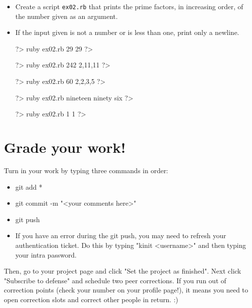 \documentclass{42-en}
\begin{document}
\makeheaderfiles

\begin{itemize}

\item Create a script \texttt{ex02.rb} that prints the prime factors, in increasing order, of the number given as an argument.
\item If the input given is not a number or is less than one, print only a newline.

\begin{42console}
	?> ruby ex02.rb 29
	29
	?>
\end{42console}

\begin{42console}
	?> ruby ex02.rb 242
	2,11,11
	?>
\end{42console}

\begin{42console}
	?> ruby ex02.rb 60
	2,2,3,5
	?>
\end{42console}

\begin{42console}
	?> ruby ex02.rb nineteen ninety six
	?>
\end{42console}

\begin{42console}
	?> ruby ex02.rb 1
	1
	?>
\end{42console}

\end{itemize}


\chapter{Grade your work!}

Turn in your work by typing three commands in order: 
\begin{itemize}
	\item git add *
	\item git commit -m "<your comments here>"
	\item git push
	\item If you have an error during the git push, you may need to refresh your authentication ticket. Do this by typing "kinit <username>" and then typing your intra password.
\end{itemize}

Then, go to your project page and click "Set the project as finished".
Next click "Subscribe to defense" and schedule two peer corrections.
If you run out of correction points (check your number on your profile page!), it means you need to open correction slots and correct other people in return. :)
\end{document}
